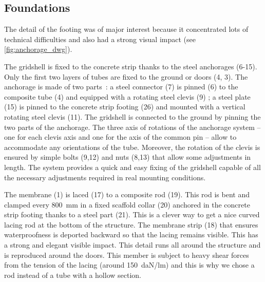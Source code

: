 %


\clearpage
\subsection{Foundations}
The detail of the footing was of major interest because it concentrated lots of technical difficulties and also had a strong visual impact (see \cref{fig:anchorage_dwg}).

The gridshell is fixed to the concrete strip thanks to the steel anchorages (6-15). Only the first two layers of tubes are fixed to the ground or doors (4, 3). The anchorage is made of two parts~: a steel connector (7) is pinned (6) to the composite tube (4) and equipped with a rotating steel clevis (9) ; a steel plate (15) is pinned to the concrete strip footing (26) and mounted with a vertical rotating steel clevis (11). The gridshell is connected to the ground by pinning the two parts of the anchorage. The three axis of rotations of the anchorage system -- one for each clevis axis and one for the axis of the common pin -- allow to accommodate any orientations of the tube. Moreover, the rotation of the clevis is ensured by simple bolts (9,12) and nuts (8,13) that allow some adjustments in length. The system provides a quick and easy fixing of the gridshell capable of all the necessary adjustments required in real mounting conditions.

The membrane (1) is laced (17) to a composite rod (19). This rod is bent and clamped every \SI{800}{mm} in a fixed scaffold collar (20) anchored in the concrete strip footing thanks to a steel part (21). This is a clever way to get a nice curved lacing rod at the bottom of the structure. The membrane strip (18) that ensures waterproofness is deported backward so that the lacing remains visible. This has a strong and elegant visible impact. This detail runs all around the structure and is reproduced around the doors. This member is subject to heavy shear forces from the tension of the lacing (around \SI{150}{daN/lm}) and this is why we chose a rod instead of a tube with a hollow section.

